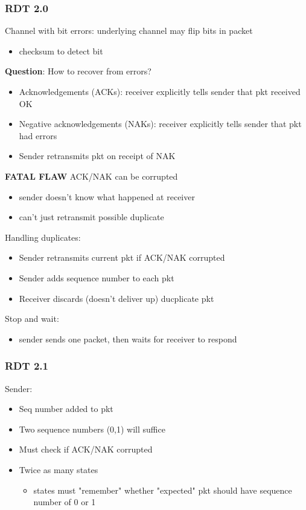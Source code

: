 \documentclass[11pt]{article}
\begin{document}
\subsubsection{RDT 2.0}
\label{sec:org2e7451d}
Channel with bit errors: underlying channel may flip bits in packet
\begin{itemize}
\item checksum to detect bit
\end{itemize}

\textbf{Question}: How to recover from errors?

\begin{itemize}
\item Acknowledgements (ACKs): receiver explicitly tells sender that pkt
received OK
\item Negative acknowledgements (NAKs): receiver explicitly tells sender
that pkt had errors
\item Sender retransmits pkt on receipt of NAK
\end{itemize}

\textbf{FATAL FLAW}
ACK/NAK can be corrupted
\begin{itemize}
\item sender doesn't know what happened at receiver
\item can't just retransmit possible duplicate
\end{itemize}

Handling duplicates:
\begin{itemize}
\item Sender retransmits current pkt if ACK/NAK corrupted
\item Sender adds sequence number to each pkt
\item Receiver discards (doesn't deliver up) ducplicate pkt
\end{itemize}

Stop and wait:
\begin{itemize}
\item sender sends one packet, then waits for receiver to respond
\end{itemize}

\subsubsection{RDT 2.1}
\label{sec:orgb2d267a}
Sender:
\begin{itemize}
\item Seq number added to pkt
\item Two sequence numbers (0,1) will suffice
\item Must check if ACK/NAK corrupted
\item Twice as many states
\begin{itemize}
\item states must "remember" whether "expected" pkt should have sequence
number of 0 or 1
\end{itemize}
\end{itemize}
\end{document}
